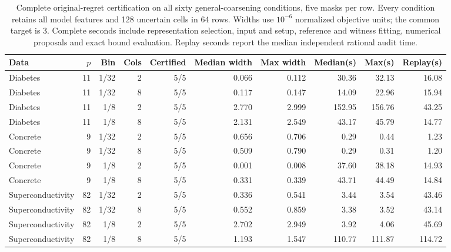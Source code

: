 \begin{table}[t]
\caption{Complete original-regret certification on all sixty general-coarsening conditions, five masks per row. Every condition retains all model features and 128 uncertain cells in 64 rows. Widths use $10^{-6}$ normalized objective units; the common target is 3. Complete seconds include representation selection, input and setup, reference and witness fitting, numerical proposals and exact bound evaluation. Replay seconds report the median independent rational audit time.}\label{tab:confirmation}
\centering\scriptsize\setlength{\tabcolsep}{4pt}\begin{tabular}{lrrrrrrrrr}\toprule
Data&$p$&Bin&Cols&Certified&Median width&Max width&Median(s)&Max(s)&Replay(s)\\\midrule
Diabetes&11&1/32&2&5/5&0.066&0.112&30.36&32.13&16.08\\
Diabetes&11&1/32&8&5/5&0.117&0.147&14.09&22.96&15.94\\
Diabetes&11&1/8&2&5/5&2.770&2.999&152.95&156.76&43.25\\
Diabetes&11&1/8&8&5/5&2.131&2.549&43.17&45.79&14.77\\
Concrete&9&1/32&2&5/5&0.656&0.706&0.29&0.44&1.23\\
Concrete&9&1/32&8&5/5&0.509&0.790&0.29&0.31&1.20\\
Concrete&9&1/8&2&5/5&0.001&0.008&37.60&38.18&14.93\\
Concrete&9&1/8&8&5/5&0.331&0.339&43.71&44.49&14.84\\
Superconductivity&82&1/32&2&5/5&0.336&0.541&3.44&3.54&43.46\\
Superconductivity&82&1/32&8&5/5&0.552&0.859&3.38&3.52&43.14\\
Superconductivity&82&1/8&2&5/5&2.702&2.949&3.92&4.06&45.69\\
Superconductivity&82&1/8&8&5/5&1.193&1.547&110.77&111.87&114.72\\
\bottomrule\end{tabular}\end{table}
